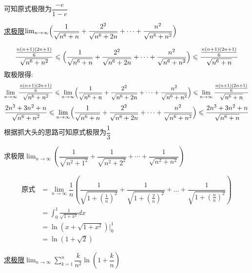 \documentclass[8pt a4paper, oneside, UTF8]{ctexbook}
\begin{document}
\begin{sloppypar}
\begin{solution}
$$        $$
        可知原式极限为$\dfrac{-e}{1-e}$
    \end{solution}
    \begin{problem}
        \uline{求极限}$\operatorname*{lim}_{n\to\infty}\Bigl(\dfrac{1}{\sqrt{n^{6}+n}}+\dfrac{2^{2}}{\sqrt{n^{6}+2n}}+\cdots+\dfrac{n^{2}}{\sqrt{n^{6}+n^{2}}}\Bigr)$
    \end{problem}
    \begin{solution}
        $$
            \dfrac{\frac{n(n+1)(2n+1)}6}{\sqrt{n^6+n^2}} \leqslant \Bigl(\dfrac{1}{\sqrt{n^{6}+n}}+\dfrac{2^{2}}{\sqrt{n^{6}+2n}}+\cdots+\dfrac{n^{2}}{\sqrt{n^{6}+n^{2}}}\Bigr) \leqslant \dfrac{\frac{n(n+1)(2n+1)}6}{\sqrt{n^6+n}}
        $$
        取极限得:
        $$
        \lim_{n\to\infty} \dfrac{\frac{n(n+1)(2n+1)}6}{\sqrt{n^6+n^2}} \leqslant  \lim_{n\to\infty} \Bigl(\dfrac{1}{\sqrt{n^{6}+n}}+\dfrac{2^{2}}{\sqrt{n^{6}+2n}}+\cdots+\dfrac{n^{2}}{\sqrt{n^{6}+n^{2}}}\Bigr) \leqslant \lim_{n\to\infty} \dfrac{\frac{n(n+1)(2n+1)}6}{\sqrt{n^6+n}}
        $$
        $$
        \dfrac{2n^3+3n^2+n}{\sqrt{n^6+n^2}} \leqslant \lim_{n\to\infty} \Bigl(\dfrac{1}{\sqrt{n^{6}+n}}+\dfrac{2^{2}}{\sqrt{n^{6}+2n}}+\cdots+\dfrac{n^{2}}{\sqrt{n^{6}+n^{2}}}\Bigr) \leqslant \dfrac{2n^3+3n^2+n}{\sqrt{n^6+n}}
        $$
        根据抓大头的思路可知原式极限为$\dfrac{1}{3}$
    \end{solution}
    \begin{problem}
        求极限$\lim_{n\to\infty}\left(\dfrac{1}{\sqrt{n^{2}+1^{2}}}+\dfrac{1}{\sqrt{n^{2}+2^{2}}}+\cdots+\dfrac{1}{\sqrt{n^{2}+n^{2}}}\right)$
    \end{problem}
    \begin{solution}
        \begin{align*}
          \text{原式} & =\lim_{n \to \infty} \dfrac{1}{n}\left(\dfrac{1}{\sqrt{1+(\frac{1}{n})^2}}+\dfrac{1}{\sqrt{1+(\frac{2}{n})^2}}+...+\dfrac{1}{\sqrt{1+(\frac{n}{n})^2}}\right)\\
          & = \int_{0}^{1}\frac{1}{\sqrt{1+x^{2}}}dx\\
          & = \ln (x+\sqrt{1+x^{2}})|_{0}^{1}\\
          & =\ln(1+\sqrt{2})
        \end{align*}
    \end{solution}
    \begin{problem}
        \uline{求极限}$\lim_{n\to\infty}\sum_{k=1}^n\dfrac{k}{n^2}\ln\left(1+\dfrac{k}{n}\right)$
    \end{problem}
    \begin{solution}

\end{solution}
\end{sloppypar}
\end{document}
